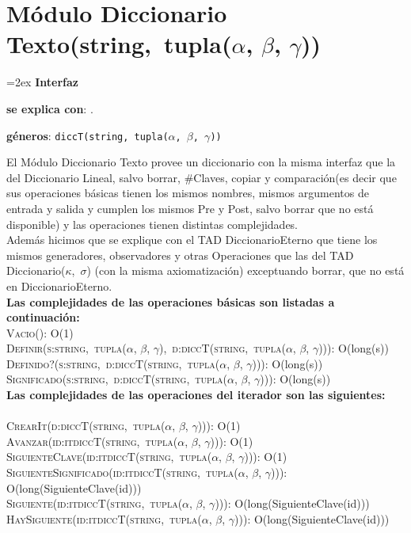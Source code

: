 \documentclass[10pt, a4paper]{article}
\let\NombreFuncion=\textsc
\let\TipoVariable=\texttt
\newcommand{\tab}{\hspace*{7mm}}
\newenvironment{Interfaz}{%
  \parskip=2ex%
  \noindent\textbf{\Large Interfaz}%
  \par%
}{}
\begin{document}
\section{M\'{o}dulo Diccionario Texto(string,\ tupla($\alpha$, $\beta$, $\gamma$))}
\begin {Interfaz}
  \textbf{se explica con}: .
  
  \textbf{g\'{e}neros}: \TipoVariable{diccT(string,\ tupla($\alpha$, $\beta$, $\gamma$))}

\tab El M\'{o}dulo Diccionario Texto provee un diccionario con la misma interfaz que la del Diccionario Lineal, salvo borrar, $\#$Claves, copiar y comparaci\'{o}n(es decir que sus operaciones b\'{a}sicas tienen los mismos nombres, mismos argumentos de entrada y salida y cumplen los mismos Pre y Post, salvo borrar que no est\'{a} disponible) y las operaciones tienen distintas complejidades.\\
\tab Adem\'{a}s hicimos que se explique con el TAD DiccionarioEterno que tiene los mismos generadores, observadores y otras Operaciones que las del TAD Diccionario($\kappa$,\ $\sigma$) (con la misma axiomatizaci\'{o}n) exceptuando borrar, que no est\'{a} en DiccionarioEterno.
\\
\tab \textbf{Las complejidades de las operaciones b\'{a}sicas son listadas a continuaci\'{o}n:} \\

  \NombreFuncion{Vacio()}{}: \tab O(1)
\\
  \NombreFuncion{Definir(s:string,\ tupla($\alpha$, $\beta$, $\gamma$),\ d:diccT(string,\ tupla($\alpha$, $\beta$, $\gamma$)))}: \tab O(long(s))
\\
  \NombreFuncion{Definido?(s:string,\ d:diccT(string,\ tupla($\alpha$, $\beta$, $\gamma$)))}: \tab O(long(s))
\\
  \NombreFuncion{Significado(s:string,\ d:diccT(string,\ tupla($\alpha$, $\beta$, $\gamma$)))}: \tab O(long(s))
\\
\tab \textbf{Las complejidades de las operaciones del iterador son las siguientes:} \\
\\
  \NombreFuncion{CrearIt(d:diccT(string,\ tupla($\alpha$, $\beta$, $\gamma$)))}: \tab O(1)
\\  
  \NombreFuncion{Avanzar(id:itdiccT(string,\ tupla($\alpha$, $\beta$, $\gamma$)))}: \tab O(1)
\\	
  \NombreFuncion{SiguienteClave(id:itdiccT(string,\ tupla($\alpha$, $\beta$, $\gamma$)))}: \tab O(1)
\\	
  \NombreFuncion{SiguienteSignificado(id:itdiccT(string,\ tupla($\alpha$, $\beta$, $\gamma$)))}: \tab O(long(SiguienteClave(id)))
\\	
  \NombreFuncion{Siguiente(id:itdiccT(string,\ tupla($\alpha$, $\beta$, $\gamma$)))}: \tab O(long(SiguienteClave(id)))
\\	
  \NombreFuncion{HaySiguiente(id:itdiccT(string,\ tupla($\alpha$, $\beta$, $\gamma$)))}: \tab O(long(SiguienteClave(id)))


\end {Interfaz}
\end{document}
